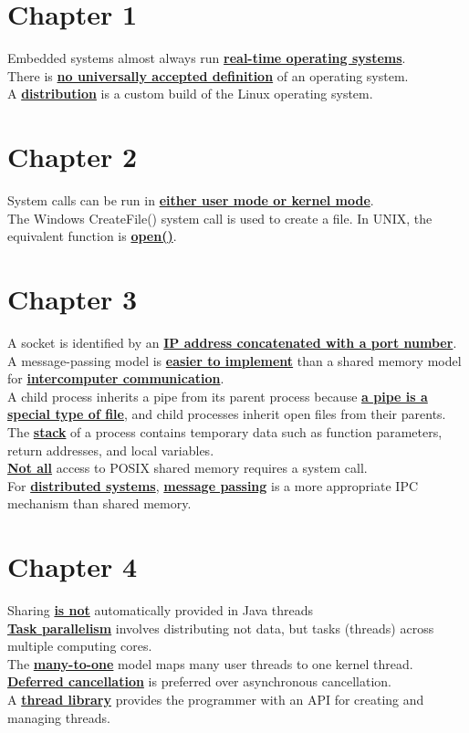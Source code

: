 \documentclass[10pt]{article}
\newcommand{\qw}[1]{\textbf{\ul{#1}}}
\begin{document}
\section*{\centering Chapter 1}
Embedded systems almost always run \qw{real-time operating systems}.\\[2mm]
There is \qw{no universally accepted definition} of an operating system.\\[2mm]
A \qw{distribution} is a custom build of the Linux operating system.\\[2mm]

\newpage
\section*{\centering Chapter 2}
System calls can be run in \qw{either user mode or kernel mode}.\\[2mm]
The Windows CreateFile() system call is used to create a file. In UNIX, the equivalent function is \qw{open()}.\\[2mm]

\newpage
\section*{\centering Chapter 3}
A socket is identified by an \qw{IP address concatenated with a port number}.\\[2mm]
A message-passing model is \qw{easier to implement} than a shared memory model for \qw{intercomputer communication}.\\[2mm]
A child process inherits a pipe from its parent process because \qw{a pipe is a special type of file}, and child processes inherit open files from their parents.\\[2mm]
The \qw{stack} of a process contains temporary data such as function parameters, return addresses, and local variables.\\[2mm]
\qw{Not all} access to POSIX shared memory requires a system call.\\[2mm]
For \qw{distributed systems}, \qw{message passing} is a more appropriate IPC mechanism than shared memory.\\[2mm]

\newpage
\section*{\centering Chapter 4}
Sharing \qw{is not} automatically provided in Java threads\\[2mm]
\qw{Task parallelism} involves distributing not data, but tasks (threads) across multiple computing cores.\\[2mm]
The \qw{many-to-one} model maps many user threads to one kernel thread.\\[2mm]
\qw{Deferred cancellation} is preferred over asynchronous cancellation.\\[2mm]
A \qw{thread library} provides the programmer with an API for creating and managing threads.\\[2mm]
\end{document}
